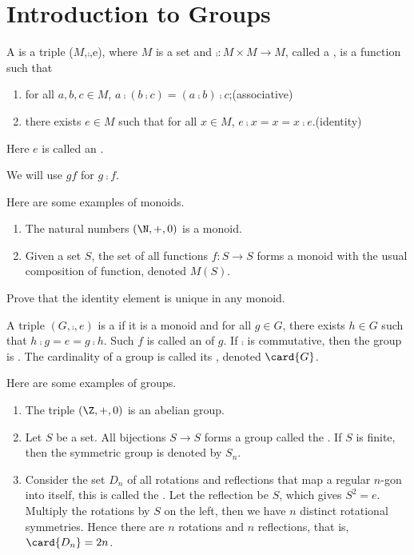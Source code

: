 \documentclass[10pt]{article}
\begin{document}
\section{Introduction to Groups}
\begin{definition}
    A  is a triple ($M$,$\comp$,e), where $M$ is a set and $\comp:M\times M\to M$, called a , is a function such that
    \begin{enumerate}
        \item for all $a,b,c\in M$, $a\comp(b\comp c)=(a\comp b)\comp c$;\hfill(associative)
        \item there exists $e\in M$ such that for all $x\in M$, $e\comp x=x=x\comp e$.\hfill(identity)
    \end{enumerate}
    Here $e$ is called an .
\end{definition}
\begin{remark}
    We will use $gf$ for $g\comp f$.
\end{remark}
\begin{example}
    Here are some examples of monoids.
    \begin{enumerate}
        \item The natural numbers $(\N,+,0)$ is a monoid.
        \item Given a set $S$, the set of all functions $f:S\to S$ forms a monoid with the usual composition of function, denoted $M(S)$.
    \end{enumerate}
\end{example}
\begin{problem}
    Prove that the identity element is unique in any monoid.
\end{problem}
\begin{definition}
    A triple $(G,\comp,e)$ is a  if it is a monoid and for all $g\in G$, there exists $h\in G$ such that $h\comp g=e=g\comp h$. Such $f$ is called an  of $g$. If $\comp$ is commutative, then the group is . The cardinality of a group is called its , denoted $\card{G}$.
\end{definition}
\begin{example}
    Here are some examples of groups.
    \begin{enumerate}
        \item The triple $(\Z,+,0)$ is an abelian group.
        \item Let $S$ be a set. All bijections $S\to S$ forms a group called the . If $S$ is finite, then the symmetric group is denoted by ${S}_{n}$.
        \item Consider the set ${D}_{n}$ of all rotations and reflections that map a regular $n$-gon into itself, this is called the . Let the reflection be $S$, which gives ${S}^{2}=e$. Multiply the rotations by $S$ on the left, then we have $n$ distinct rotational symmetries. Hence there are $n$ rotations and $n$ reflections, that is, $\card{{D}_{n}}=2n$.
    \end{enumerate}    
\end{example}
\end{document}
